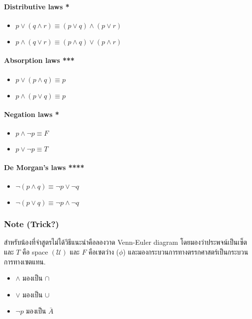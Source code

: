 \documentclass[12pt,a4paper]{article}
\begin{document}
\paragraph{Distributive laws *}
\begin{itemize}
    \item $p \lor (q \land r) \equiv (p \lor q) \land (p \lor r)$
    \item $p \land (q \lor r) \equiv (p \land q) \lor (p \land r)$
\end{itemize}

\paragraph{Absorption laws ***}
\begin{itemize}
    \item $p \lor (p \land q) \equiv p$
    \item $p \land (p \lor q) \equiv p$
\end{itemize}
\paragraph{Negation laws *}
\begin{itemize}
    \item $p \land \neg p \equiv F$
    \item $p \lor \neg p \equiv T$
\end{itemize}
\paragraph{De Morgan's laws ****}
\begin{itemize}
    \item $\neg(p \land q) \equiv \neg p \lor \neg q$
    \item $\neg(p \lor q) \equiv \neg p \land \neg q$
\end{itemize}


\subsubsection*{Note (Trick?)}
สำหรับน้องที่จำสูตรไม่ได้วิธีแนะนำคือลองวาด Venn-Euler diagram โดยมองว่าประพจน์เป็นเซ็ต และ $T$ คือ space $\left( \mathcal{U} \right)$ และ $F$ คือเซตว่าง ($\phi$) และมองกระบวนการทางตรรกศาสตร์เป็นกระบวนการทางเซตแทน. \\
\begin{itemize}
    \item $\land$ มองเป็น $\cap$
    \item $\lor$ มองเป็น $\cup$
    \item $\neg p$ มองเป็น $\bar{A}$
\end{itemize}
\end{document}
